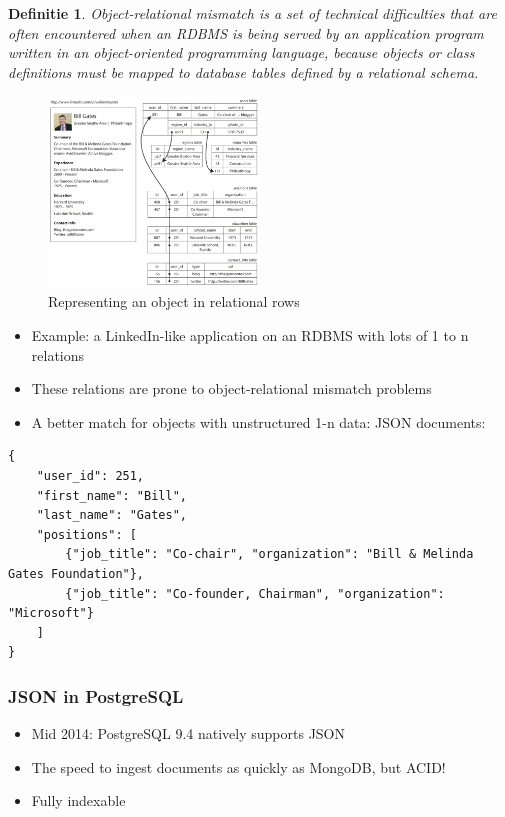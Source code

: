 \documentclass{article}
\newtheorem{theorem}{Definitie}[section]
\begin{document}
\begin{theorem}
    Object-relational mismatch is a set of technical difficulties that are often
    encountered when an RDBMS is being served by an application program written 
    in an object-oriented programming language, because objects or class definitions 
    must be mapped to database tables defined by a relational schema.
\end{theorem}

\begin{figure}[H]
    \centering
    \includegraphics[width=0.5\textwidth]{billgates.png}
    \caption{Representing an object in relational rows}
\end{figure}

\begin{itemize}
    \item Example: a LinkedIn-like application on an RDBMS with lots of 1 to n relations
    \item These relations are prone to object-relational mismatch problems
    \item A better match for objects with unstructured 1-n data: JSON documents:
\end{itemize}

\begin{verbatim}
{
    "user_id": 251,
    "first_name": "Bill",
    "last_name": "Gates",
    "positions": [
        {"job_title": "Co-chair", "organization": "Bill & Melinda Gates Foundation"},
        {"job_title": "Co-founder, Chairman", "organization": "Microsoft"}
    ]
}
\end{verbatim}

\subsubsection{JSON in PostgreSQL}

\begin{itemize}
    \item Mid 2014: PostgreSQL 9.4 natively supports JSON
    \item The speed to ingest documents as quickly as MongoDB, but ACID!
    \item Fully indexable
\end{itemize}
\end{document}
